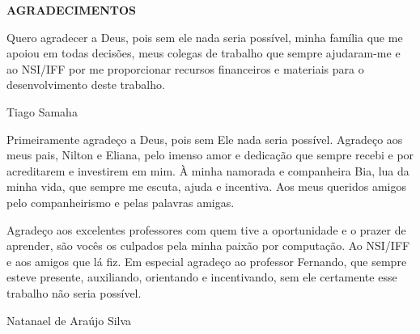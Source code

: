\begin{center}
\textbf{AGRADECIMENTOS}
\end{center}

Quero agradecer a Deus, pois sem ele nada seria possível, minha família que me apoiou em todas decisões, meus colegas de trabalho que sempre ajudaram-me e ao NSI/IFF por me proporcionar recursos financeiros e materiais para o desenvolvimento deste trabalho.

Tiago Samaha

Primeiramente agradeço a Deus, pois sem Ele nada seria possível. Agradeço aos meus pais, Nilton e Eliana, pelo imenso amor e dedicação que sempre recebi e por acreditarem e investirem em mim. À minha namorada e companheira Bia, lua da minha vida, que sempre me escuta, ajuda e incentiva. Aos meus queridos amigos pelo companheirismo e pelas palavras amigas.

Agradeço aos excelentes professores com quem tive a oportunidade e o prazer de aprender, são vocês os culpados pela minha paixão por computação. Ao NSI/IFF e aos amigos que lá fiz. Em especial agradeço ao professor Fernando, que sempre esteve presente, auxiliando, orientando e incentivando, sem ele certamente esse trabalho não seria possível.

Natanael de Araújo Silva
